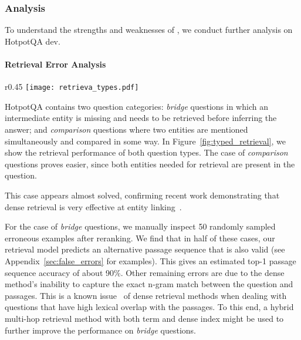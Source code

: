 \subsubsection{Analysis}
\label{sec:retrieval_analysis}
\label{sec:error_analysis}

To understand the strengths and weaknesses of \method, we conduct further analysis on HotpotQA dev. %

\paragraph{Retrieval Error Analysis}

\begin{wrapfigure}{r}{0.45\textwidth}
\texttt{[image: retrieva\_types.pdf]}
\vspace{-20pt}
\caption{The retrieval performance gap between comparison and bridge questions. Left: recall of groundtruth passage sequences without reranking. Right: Top-1 chain exact match after reranking.}
\vspace{-10pt}
\label{fig:typed_retrieval}
\end{wrapfigure}

HotpotQA contains two question categories: \emph{bridge} questions in which an intermediate entity is missing and needs to be retrieved before inferring the answer; and \emph{comparison} questions where two entities are mentioned simultaneously and compared in some way. In Figure~\ref{fig:typed_retrieval}, we show the retrieval performance of both question types.  The case of \textit{comparison} questions proves easier, since both entities needed for retrieval are present in the question. 

This case appears almost solved, confirming recent work demonstrating that dense retrieval is very effective at entity linking~\citep{blink}.

For the case of \textit{bridge} questions, we manually inspect 50 randomly sampled erroneous examples after reranking. We find that in half of these cases, our retrieval model predicts an alternative passage sequence that is also valid (see Appendix~\ref{sec:false_errors} for examples). This gives an estimated top-1 passage sequence accuracy of about 90\%. 
Other remaining errors are due to the dense method's inability to capture the exact n-gram match between the question and passages. This is a known issue~\citep{ORQA, DPR} of dense retrieval methods when dealing with questions that have high lexical overlap with the passages. To this end, a hybrid multi-hop retrieval method with both term and dense index might be used to further improve the performance on \textit{bridge} questions. 

